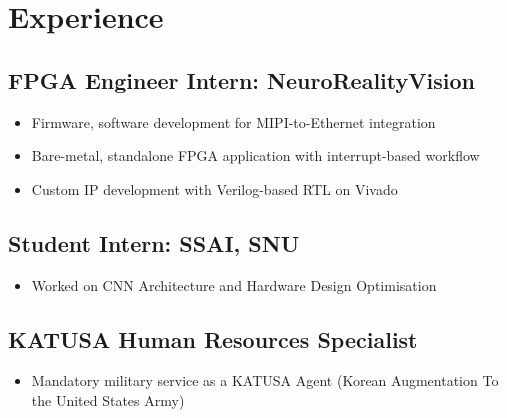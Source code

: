 \documentclass[10pt]{article}
\begin{document}
\section*{Experience}

\subsection*{FPGA Engineer Intern: NeuroRealityVision}
\begin{itemize}
  \item Firmware, software development for MIPI-to-Ethernet integration
  \item Bare-metal, standalone FPGA application with interrupt-based workflow
  \item Custom IP development with Verilog-based RTL on Vivado
\end{itemize}

\subsection*{Student Intern: SSAI, SNU}
\begin{itemize}
  \item Worked on CNN Architecture and Hardware Design Optimisation
\end{itemize}

\subsection*{KATUSA Human Resources Specialist}
\begin{itemize}
  \item Mandatory military service as a KATUSA Agent
    (Korean Augmentation To the United States Army)
\end{itemize}








\end{document}
